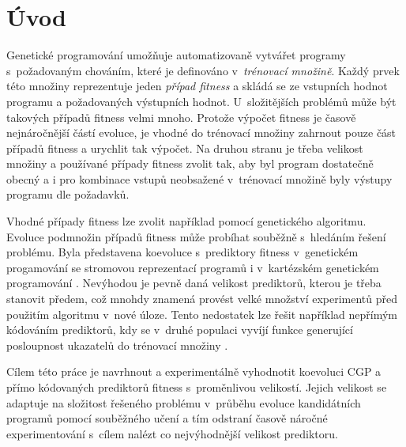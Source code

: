 \documentclass[fleqn,11pt]{ExcelAtFIT} %
\affiliation{*%
    \href{mailto:xwigla00@stud.fit.vutbr.cz}{xwigla00@stud.fit.vutbr.cz},
    \textit{Fakulta informačních technologií, Vysoké učení technické v~Brně}}
\begin{document}
\startdocument



\section{Úvod}

Genetické programování umožňuje automatizovaně vytvářet programy s~požadovaným chováním, které je definováno v~\emph{trénovací množině}. Každý prvek této množiny reprezentuje jeden \emph{případ fitness} a skládá se ze vstupních hodnot programu a po\-ža\-do\-va\-ných výstupních hodnot. U~složitějších problémů může být takových případů fitness velmi mnoho. Protože výpočet fitness je časově nejnáročnější částí evoluce, je vhodné do trénovací množiny zahrnout pouze část případů fitness a urychlit tak výpočet. Na druhou stranu je třeba velikost množiny a používané případy fitness zvolit tak, aby byl program dostatečně obecný a i pro kombinace vstupů neobsažené v~trénovací množině byly výstupy programu dle požadavků.

Vhodné případy fitness lze zvolit například pomocí genetického algoritmu. Evoluce podmnožin případů fitness může probíhat souběžně s~hledáním řešení problému. Byla představena koevoluce s~prediktory fitness v~genetickém progamování se stromovou reprezentací programů \cite{Schmidt} i v~kartézském genetickém programování \cite{SikuEuroGP}. Nevýhodou je pevně daná velikost prediktorů, kterou je třeba stanovit předem, což mnohdy znamená provést velké množství experimentů před použitím algoritmu v~nové úloze. Tento nedostatek lze řešit například nepřímým kódováním prediktorů, kdy se v~druhé populaci vyvíjí funkce generující posloupnost ukazatelů do trénovací množiny \cite{SikuHulva}.

Cílem této práce je navrhnout a experimentálně vyhodnotit koevoluci CGP a přímo kódovaných prediktorů fitness s~proměnlivou velikostí. Jejich velikost se adaptuje na složitost řešeného problému v~průběhu evoluce kandidátních programů pomocí souběžného učení a tím odstraní časově náročné experimentování s~cílem nalézt co nejvýhodnější velikost prediktoru.
\end{document}
